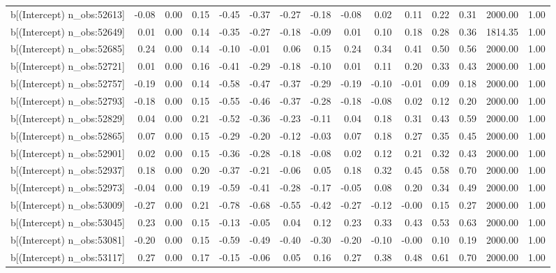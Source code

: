 \begin{table}[ht]
\begin{tabular}{rrrrrrrrrrrrrrr}
  b[(Intercept) n\_obs:52613] & -0.08 & 0.00 & 0.15 & -0.45 & -0.37 & -0.27 & -0.18 & -0.08 & 0.02 & 0.11 & 0.22 & 0.31 & 2000.00 & 1.00 \\ 
  b[(Intercept) n\_obs:52649] & 0.01 & 0.00 & 0.14 & -0.35 & -0.27 & -0.18 & -0.09 & 0.01 & 0.10 & 0.18 & 0.28 & 0.36 & 1814.35 & 1.00 \\ 
  b[(Intercept) n\_obs:52685] & 0.24 & 0.00 & 0.14 & -0.10 & -0.01 & 0.06 & 0.15 & 0.24 & 0.34 & 0.41 & 0.50 & 0.56 & 2000.00 & 1.00 \\ 
  b[(Intercept) n\_obs:52721] & 0.01 & 0.00 & 0.16 & -0.41 & -0.29 & -0.18 & -0.10 & 0.01 & 0.11 & 0.20 & 0.33 & 0.43 & 2000.00 & 1.00 \\ 
  b[(Intercept) n\_obs:52757] & -0.19 & 0.00 & 0.14 & -0.58 & -0.47 & -0.37 & -0.29 & -0.19 & -0.10 & -0.01 & 0.09 & 0.18 & 2000.00 & 1.00 \\ 
  b[(Intercept) n\_obs:52793] & -0.18 & 0.00 & 0.15 & -0.55 & -0.46 & -0.37 & -0.28 & -0.18 & -0.08 & 0.02 & 0.12 & 0.20 & 2000.00 & 1.00 \\ 
  b[(Intercept) n\_obs:52829] & 0.04 & 0.00 & 0.21 & -0.52 & -0.36 & -0.23 & -0.11 & 0.04 & 0.18 & 0.31 & 0.43 & 0.59 & 2000.00 & 1.00 \\ 
  b[(Intercept) n\_obs:52865] & 0.07 & 0.00 & 0.15 & -0.29 & -0.20 & -0.12 & -0.03 & 0.07 & 0.18 & 0.27 & 0.35 & 0.45 & 2000.00 & 1.00 \\ 
  b[(Intercept) n\_obs:52901] & 0.02 & 0.00 & 0.15 & -0.36 & -0.28 & -0.18 & -0.08 & 0.02 & 0.12 & 0.21 & 0.32 & 0.43 & 2000.00 & 1.00 \\ 
  b[(Intercept) n\_obs:52937] & 0.18 & 0.00 & 0.20 & -0.37 & -0.21 & -0.06 & 0.05 & 0.18 & 0.32 & 0.45 & 0.58 & 0.70 & 2000.00 & 1.00 \\ 
  b[(Intercept) n\_obs:52973] & -0.04 & 0.00 & 0.19 & -0.59 & -0.41 & -0.28 & -0.17 & -0.05 & 0.08 & 0.20 & 0.34 & 0.49 & 2000.00 & 1.00 \\ 
  b[(Intercept) n\_obs:53009] & -0.27 & 0.00 & 0.21 & -0.78 & -0.68 & -0.55 & -0.42 & -0.27 & -0.12 & -0.00 & 0.15 & 0.27 & 2000.00 & 1.00 \\ 
  b[(Intercept) n\_obs:53045] & 0.23 & 0.00 & 0.15 & -0.13 & -0.05 & 0.04 & 0.12 & 0.23 & 0.33 & 0.43 & 0.53 & 0.63 & 2000.00 & 1.00 \\ 
  b[(Intercept) n\_obs:53081] & -0.20 & 0.00 & 0.15 & -0.59 & -0.49 & -0.40 & -0.30 & -0.20 & -0.10 & -0.00 & 0.10 & 0.19 & 2000.00 & 1.00 \\ 
  b[(Intercept) n\_obs:53117] & 0.27 & 0.00 & 0.17 & -0.15 & -0.06 & 0.05 & 0.16 & 0.27 & 0.38 & 0.48 & 0.61 & 0.70 & 2000.00 & 1.00 \\ 

\end{tabular}
\end{table}
